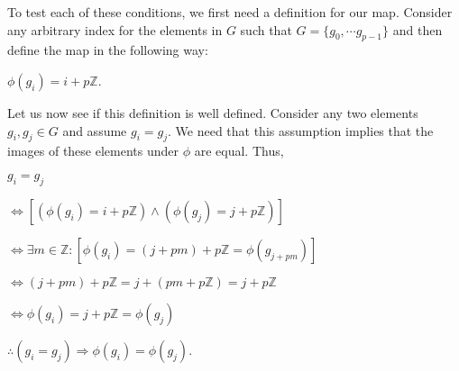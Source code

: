 \documentclass[12pt, a4paper]{article}
\begin{document}
\vspace{4mm}

    To test each of these conditions, we first need a definition for our map. Consider any arbitrary index for the elements in $G$ such that $G=\{g_0, \cdots g_{p-1}\}$ and then define the map in the following way:\par
    
\vspace{4mm}

        \centerline{$\phi(g_i)=i+p\mathbb{Z}$.}
        
\vspace{4mm}

\newpage

    Let us now see if this definition is well defined. Consider any two elements $g_i,g_j\in G$ and assume $g_i=g_j$. We need that this assumption implies that the images of these elements under $\phi$ are equal. Thus, \par
    
\vspace{4mm}

\hspace{10mm} $g_i=g_j$

\vspace{2mm}

\hspace{18mm} $\Leftrightarrow [(\phi(g_i)=i+p\mathbb{Z})\wedge(\phi(g_j)=j+p\mathbb{Z})]$

\vspace{2mm}

\hspace{18mm} $\Leftrightarrow\exists m\in\mathbb{Z}\colon[\phi(g_i)=(j+pm)+p\mathbb{Z}=\phi(g_{j+pm})]$

\vspace{2mm}

\hspace{18mm} $\Leftrightarrow (j+pm)+p\mathbb{Z}=j+(pm+p\mathbb{Z})=j+p\mathbb{Z}$

\vspace{2mm}

\hspace{18mm} $\Leftrightarrow \phi(g_i)=j+p\mathbb{Z}=\phi(g_j)$

\vspace{2mm}

\hspace{18mm} $\therefore$\hspace{3mm}$(g_i=g_j)\Rightarrow\phi(g_i)=\phi(g_j)$.

\vspace{4mm}
\end{document}
